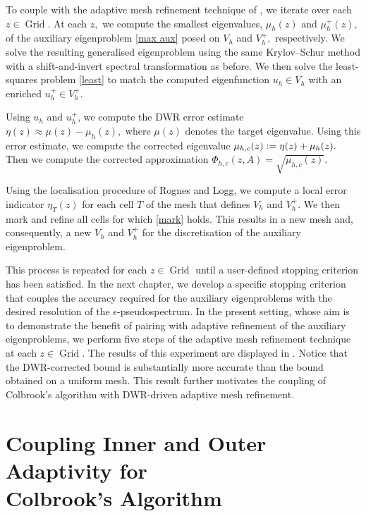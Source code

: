 To couple  with the adaptive mesh refinement technique of , we iterate over each $z \in \operatorname{Grid}.$ At each $z,$ we compute the smallest eigenvalues, $\mu_h(z)$ and $\mu_h^+(z),$ of the auxiliary eigenproblem \eqref{max aux} posed on $V_h$ and $V_h^+,$ respectively. We solve the resulting generalised eigenproblem using the same Krylov--Schur method with a shift-and-invert spectral transformation as before.
We then solve the least-squares problem \eqref{least} to match the computed eigenfunction $u_h \in V_h$ with an enriched $u_h^+ \in V_h^+.$

Using $u_h$ and $u_h^+$, we compute the DWR error estimate $\eta(z) \approx \mu(z) - \mu_h(z),$ where $\mu(z)$ denotes the target eigenvalue. Using this error estimate, we compute the corrected eigenvalue $\mu_{h, c}(z) \vcentcolon= \eta(z) + \mu_h(z).$ Then we compute the corrected approximation $\Phi_{h,c}(z,A) = \sqrt{ \mu_{h,c}(z) }.$ 

Using the localisation procedure of Rognes and Logg, we compute a local error indicator $\eta_T(z)$ for each cell $T$ of the mesh that defines $V_h$ and $V_h^+$. We then mark and refine all cells for which \eqref{mark} holds. This results in a new mesh and, consequently, a new $V_h$ and $V_h^+$ for the discretisation of the auxiliary eigenproblem. 


This process is repeated for each $z \in \operatorname{Grid}$ until a user-defined stopping criterion has been satisfied. In the next chapter, we develop a specific stopping criterion that couples the accuracy required for the auxiliary eigenproblems with the desired resolution of the $\epsilon$-pseudospectrum. In the present setting, whose aim is to demonstrate the benefit of pairing  with adaptive refinement of the auxiliary eigenproblems, we perform five steps of the adaptive mesh refinement technique at each $z \in \operatorname{Grid}.$ The results of this experiment are displayed in . Notice that the DWR-corrected bound is substantially more accurate than the bound obtained on a uniform mesh. This result further motivates the coupling of Colbrook's algorithm with DWR-driven adaptive mesh refinement.




\section[Coupling Inner and Outer Adaptivity for Colbrook's Algorithm]{Coupling Inner and Outer Adaptivity for\\Colbrook's Algorithm}\label{Sect32}

